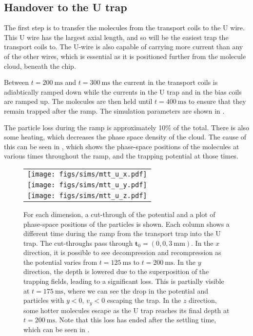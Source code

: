 \subsection{Handover to the U trap}
\label{design:sim:trans_U}


%
The first step is to transfer the molecules from the transport coils to the U
wire. This U wire has the largest axial length, and so will be the easiest trap
the transport coils to. The U-wire is also capable of carrying more current
than any of the other wires, which is essential as it is positioned further
from the molecule cloud, beneath the chip.

Between $t=\SI{200}{\milli\second}$ and $t=\SI{300}{\milli\second}$ the current
in the transport coils is adiabtically ramped down while the currents in
the U trap and in the bias coils are ramped up. The molecules are then held
until $t=\SI{400}{\milli\second}$ to ensure that they remain trapped after the
ramp. The simulation parameters are shown in
.

The particle loss during the ramp is approximately 10\% of the total. There is
also some heating, which decreases the phase space density of the cloud. The
cause of this can be seen in , which shows the
phase-space positions of the molecules at various times throughout the ramp,
and the trapping potential at those times.

\begin{figure}[p]
\centering
  \begin{tabular}{c}
    \texttt{[image: figs/sims/mtt\_u\_x.pdf]} \\
    \texttt{[image: figs/sims/mtt\_u\_y.pdf]} \\
    \texttt{[image: figs/sims/mtt\_u\_z.pdf]}
  \end{tabular}
  \caption{
    For each dimension, a cut-through of the potential and a plot of
    phase-space positions of the particles is shown. Each column shows a
    different time during the ramp from the transport trap into the U trap. The
    cut-throughs pass through $\mathbf{t}_0 = (0, 0, \SI{3}{\milli\meter})$. In
    the $x$ direction, it is possible to see decompression and recompression as
    the potential varies from $t=\SI{125}{\milli\second}$ to
    $t=\SI{200}{\milli\second}$. In the $y$ direction, the depth is lowered due
    to the superposition of the trapping fields, leading to a significant loss.
    This is partially visible at $t=\SI{175}{\milli\second}$, where we can see
    the drop in the potential and particles with $y<0$, $v_y<0$ escaping the
    trap. In the $z$ direction, some hotter molecules escape as the U trap
    reaches its final depth at $t=\SI{200}{\milli\second}$. Note that this loss
    has ended after the settling time, which can be seen in
    .
  }
  \label{design:fig:trans_U}
\end{figure}

